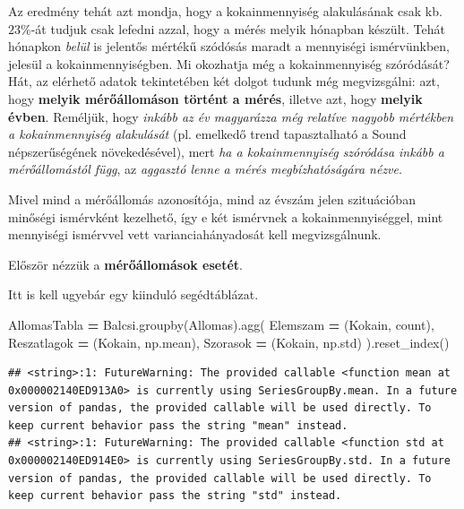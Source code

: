 \documentclass[
]{book}
\newenvironment{Shaded}{\begin{snugshade}}{\end{snugshade}}
\newcommand{\NormalTok}[1]{#1}
\newcommand{\OperatorTok}[1]{\textcolor[rgb]{0.81,0.36,0.00}{\textbf{#1}}}
\newcommand{\StringTok}[1]{\textcolor[rgb]{0.31,0.60,0.02}{#1}}
\begin{document}
Az eredmény tehát azt mondja, hogy a kokainmennyiség alakulásának csak kb. \(23\%\)-át tudjuk csak lefedni azzal, hogy a mérés melyik hónapban készült. Tehát hónapkon \emph{belül} is jelentős mértékű szódósás maradt a mennyiségi ismérvünkben, jelesül a kokainmennyiségben.
Mi okozhatja még a kokainmennyiség szóródását? Hát, az elérhető adatok tekintetében két dolgot tudunk még megvizsgálni: azt, hogy \textbf{melyik mérőállomáson történt a mérés}, illetve azt, hogy \textbf{melyik évben}. Reméljük, hogy \emph{inkább az év magyarázza még relatíve nagyobb mértékben a kokainmennyiség alakulását} (pl. emelkedő trend tapasztalható a Sound népszerűségének növekedésével), mert \emph{ha a kokainmennyiség szóródása inkább a mérőállomástól függ}, az \emph{aggasztó lenne a mérés megbízhatóságára nézve}.

Mivel mind a mérőállomás azonosítója, mind az évszám jelen szituációban minőségi ismérvként kezelhető, így e két ismérvnek a kokainmennyiséggel, mint mennyiségi ismérvvel vett varianciahányadosát kell megvizsgálnunk.

Először nézzük a \textbf{mérőállomások esetét}.

Itt is kell ugyebár egy kiinduló segédtáblázat.

\begin{Shaded}
\begin{Highlighting}[]
\NormalTok{AllomasTabla }\OperatorTok{=}\NormalTok{ Balcsi.groupby(}\StringTok{\textquotesingle{}Allomas\textquotesingle{}}\NormalTok{).agg(}
\NormalTok{  Elemszam }\OperatorTok{=}\NormalTok{ (}\StringTok{\textquotesingle{}Kokain\textquotesingle{}}\NormalTok{, }\StringTok{\textquotesingle{}count\textquotesingle{}}\NormalTok{),}
\NormalTok{  Reszatlagok }\OperatorTok{=}\NormalTok{ (}\StringTok{\textquotesingle{}Kokain\textquotesingle{}}\NormalTok{, np.mean),}
\NormalTok{  Szorasok }\OperatorTok{=}\NormalTok{ (}\StringTok{\textquotesingle{}Kokain\textquotesingle{}}\NormalTok{, np.std)}
\NormalTok{).reset\_index()}
\end{Highlighting}
\end{Shaded}

\begin{verbatim}
## <string>:1: FutureWarning: The provided callable <function mean at 0x000002140ED913A0> is currently using SeriesGroupBy.mean. In a future version of pandas, the provided callable will be used directly. To keep current behavior pass the string "mean" instead.
## <string>:1: FutureWarning: The provided callable <function std at 0x000002140ED914E0> is currently using SeriesGroupBy.std. In a future version of pandas, the provided callable will be used directly. To keep current behavior pass the string "std" instead.
\end{verbatim}
\end{document}
